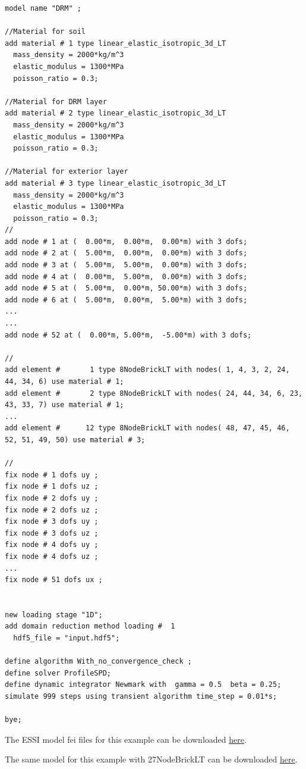 %
\begin{lstlisting}
model name "DRM" ;

//Material for soil
add material # 1 type linear_elastic_isotropic_3d_LT
  mass_density = 2000*kg/m^3
  elastic_modulus = 1300*MPa
  poisson_ratio = 0.3;

//Material for DRM layer
add material # 2 type linear_elastic_isotropic_3d_LT
  mass_density = 2000*kg/m^3
  elastic_modulus = 1300*MPa
  poisson_ratio = 0.3;

//Material for exterior layer
add material # 3 type linear_elastic_isotropic_3d_LT
  mass_density = 2000*kg/m^3
  elastic_modulus = 1300*MPa
  poisson_ratio = 0.3;
//
add node # 1 at (  0.00*m,  0.00*m,  0.00*m) with 3 dofs;
add node # 2 at (  5.00*m,  0.00*m,  0.00*m) with 3 dofs;
add node # 3 at (  5.00*m,  5.00*m,  0.00*m) with 3 dofs;
add node # 4 at (  0.00*m,  5.00*m,  0.00*m) with 3 dofs;
add node # 5 at (  5.00*m,  0.00*m, 50.00*m) with 3 dofs;
add node # 6 at (  5.00*m,  0.00*m,  5.00*m) with 3 dofs;
...
...
add node # 52 at (  0.00*m, 5.00*m,  -5.00*m) with 3 dofs;

//
add element #       1 type 8NodeBrickLT with nodes( 1, 4, 3, 2, 24, 44, 34, 6) use material # 1;
add element #       2 type 8NodeBrickLT with nodes( 24, 44, 34, 6, 23, 43, 33, 7) use material # 1;
...
add element #      12 type 8NodeBrickLT with nodes( 48, 47, 45, 46, 52, 51, 49, 50) use material # 3;

//
fix node # 1 dofs uy ;
fix node # 1 dofs uz ;
fix node # 2 dofs uy ;
fix node # 2 dofs uz ;
fix node # 3 dofs uy ;
fix node # 3 dofs uz ;
fix node # 4 dofs uy ;
fix node # 4 dofs uz ;
...
fix node # 51 dofs ux ;


new loading stage "1D";
add domain reduction method loading #  1
  hdf5_file = "input.hdf5";

define algorithm With_no_convergence_check ;
define solver ProfileSPD;
define dynamic integrator Newmark with  gamma = 0.5  beta = 0.25;
simulate 999 steps using transient algorithm time_step = 0.01*s;

bye;
\end{lstlisting}

The ESSI model fei files for this example can be downloaded 
\href{https://github.com/BorisJeremic/Real-ESSI-Examples/blob/master/model_fei_file/8NodeBrick_DRM_1D/8NodeBrick_DRM_1D.tgz?raw=true}{here}.

The same model for this example with 27NodeBrickLT can be downloaded 
\href{https://github.com/BorisJeremic/Real-ESSI-Examples/blob/master/model_fei_file/27NodeBrick_DRM_1D/27NodeBrick_DRM_1D.tgz?raw=true}{here}.








